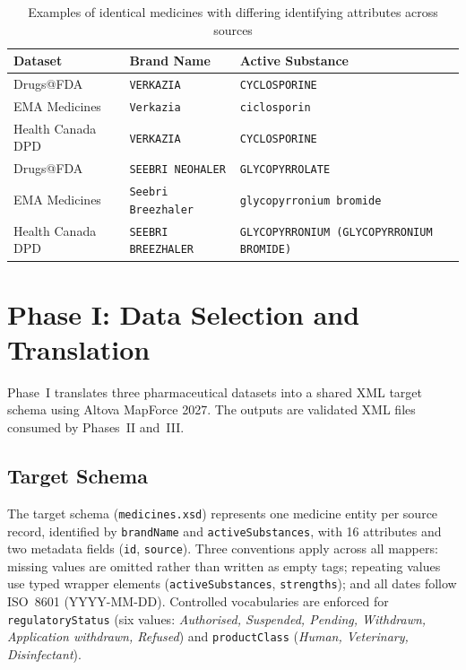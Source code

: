 \documentclass[a4paper,oneside,bibliography=totoc]{scrbook}
\begin{document}
\begin{table}[htbp]
\centering
\caption{Examples of identical medicines with differing identifying attributes across sources}
\label{tab:difficult_match}
\footnotesize
\begin{tabularx}{\textwidth}{|l|l|X|}
\hline
\textbf{Dataset} & \textbf{Brand Name} & \textbf{Active Substance} \\
\hline
Drugs@FDA & \texttt{VERKAZIA} & \texttt{CYCLOSPORINE} \\
EMA Medicines & \texttt{Verkazia} & \texttt{ciclosporin} \\
Health Canada DPD & \texttt{VERKAZIA} & \texttt{CYCLOSPORINE} \\
\hline
Drugs@FDA & \texttt{SEEBRI NEOHALER} & \texttt{GLYCOPYRROLATE} \\
EMA Medicines & \texttt{Seebri Breezhaler} & \texttt{glycopyrronium bromide} \\
Health Canada DPD & \texttt{SEEBRI BREEZHALER} & \texttt{GLYCOPYRRONIUM (GLYCOPYRRONIUM BROMIDE)} \\
\hline
\end{tabularx}
\end{table}

\section{Phase I: Data Selection and Translation}

Phase~I translates three pharmaceutical datasets into a shared XML target
schema using Altova MapForce 2027. The outputs are validated XML files
consumed by Phases~II and~III.

\subsection{Target Schema}

The target schema (\texttt{medicines.xsd}) represents one medicine entity
per source record, identified by \texttt{brandName} and
\texttt{activeSubstances}, with 16 attributes and two metadata fields
(\texttt{id}, \texttt{source}). Three conventions apply across all
mappers: missing values are omitted rather than written as empty tags;
repeating values use typed wrapper elements (\texttt{activeSubstances},
\texttt{strengths}); and all dates follow ISO~8601 (YYYY-MM-DD).
Controlled vocabularies are enforced for \texttt{regulatoryStatus} (six
values: \textit{Authorised, Suspended, Pending, Withdrawn, Application
withdrawn, Refused}) and \texttt{productClass} (\textit{Human,
Veterinary, Disinfectant}).
\end{document}
